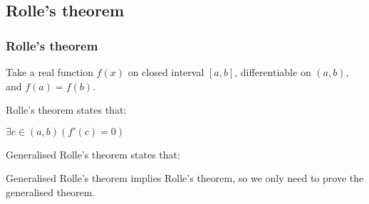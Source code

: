 
\subsection{Rolle's theorem}

\subsubsection{Rolle's theorem}

Take a real function \(f(x)\) on closed interval \([a,b]\), differentiable on \((a,b)\), and \(f(a)=f(b)\).

Rolle’s theorem states that:

\(\exists c\in(a,b) (f'(c)=0)\)

Generalised Rolle’s theorem states that:

Generalised Rolle’s theorem implies Rolle’s theorem, so we only need to prove the generalised theorem.

